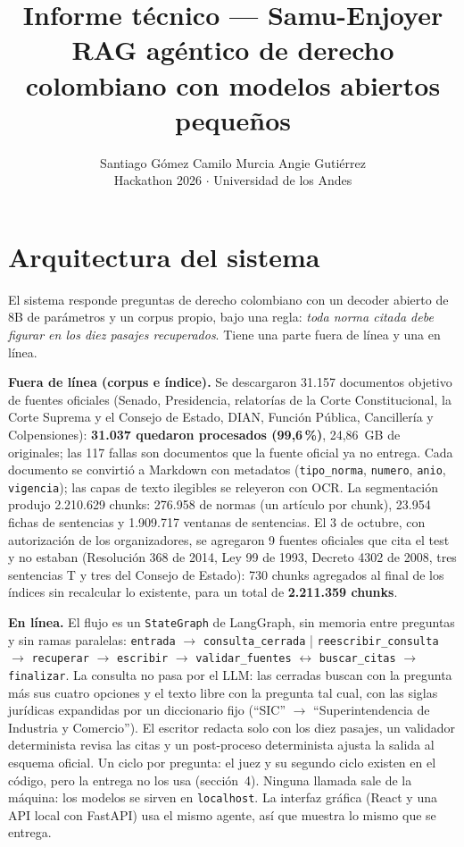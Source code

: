 \documentclass[10pt,twocolumn,letterpaper]{article}
\title{\vspace{-1.0cm}\Large\bfseries Informe técnico --- Samu-Enjoyer\\[3pt]
  \large\mdseries RAG agéntico de derecho colombiano con modelos abiertos pequeños}
\author{Santiago Gómez \quad Camilo Murcia \quad Angie Gutiérrez\\[2pt]
  \small Hackathon 2026 $\cdot$ Universidad de los Andes}
\date{}
\newcommand{\cod}[1]{\texttt{#1}}
\begin{document}
\maketitle
\vspace{-0.9cm}

\section{Arquitectura del sistema}

El sistema responde preguntas de derecho colombiano con un decoder abierto de 8B de
parámetros y un corpus propio, bajo una regla: \emph{toda norma citada debe figurar en
los diez pasajes recuperados}. Tiene una parte fuera de línea y una en línea.

\textbf{Fuera de línea (corpus e índice).} Se descargaron 31.157 documentos objetivo de
fuentes oficiales (Senado, Presidencia, relatorías de la Corte Constitucional, la Corte
Suprema y el Consejo de Estado, DIAN, Función Pública, Cancillería y Colpensiones):
\textbf{31.037 quedaron procesados (99,6\,\%)}, 24,86~GB de originales; las 117 fallas
son documentos que la fuente oficial ya no entrega. Cada documento se convirtió a Markdown
con metadatos (\cod{tipo\_norma}, \cod{numero}, \cod{anio}, \cod{vigencia}); las capas de
texto ilegibles se releyeron con OCR. La segmentación produjo 2.210.629 chunks: 276.958
de normas (un artículo por chunk), 23.954 fichas de sentencias y 1.909.717 ventanas de
sentencias. El 3 de octubre, con autorización de los organizadores, se agregaron 9
fuentes oficiales que cita el test y no estaban (Resolución 368 de 2014, Ley 99 de 1993,
Decreto 4302 de 2008, tres sentencias T y tres del Consejo de Estado): 730 chunks
agregados al final de los índices sin recalcular lo existente, para un total de
\textbf{2.211.359 chunks}.

\textbf{En línea.} El flujo es un \cod{StateGraph} de LangGraph, sin memoria entre
preguntas y sin ramas paralelas:
\cod{entrada} $\to$ \cod{consulta\_cerrada} | \cod{reescribir\_consulta} $\to$
\cod{recuperar} $\to$ \cod{escribir} $\to$ \cod{validar\_fuentes} $\leftrightarrow$
\cod{buscar\_citas} $\to$ \cod{finalizar}.
La consulta no pasa por el LLM: las cerradas buscan con la pregunta más sus cuatro
opciones y el texto libre con la pregunta tal cual, con las siglas jurídicas expandidas
por un diccionario fijo (``SIC'' $\to$ ``Superintendencia de Industria y Comercio'').
El escritor redacta solo con los diez pasajes, un validador determinista revisa las
citas y un post-proceso determinista ajusta la salida al esquema oficial. Un ciclo por
pregunta: el juez y su segundo ciclo existen en el código, pero la entrega no los usa
(sección~4). Ninguna llamada sale de la máquina: los modelos se sirven en
\cod{localhost}. La interfaz gráfica (React y una API local con FastAPI) usa el mismo
agente, así que muestra lo mismo que se entrega.
\end{document}
